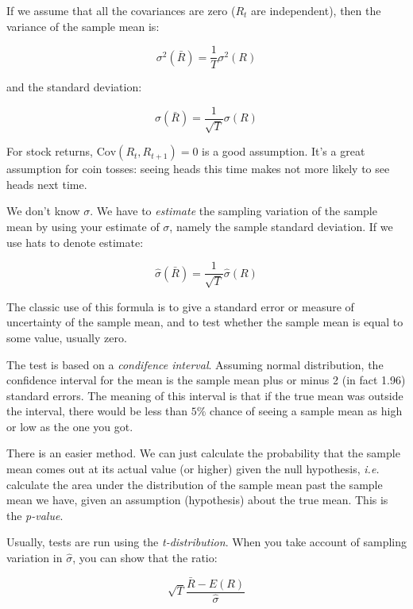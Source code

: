 If we assume that all the covariances are zero ($R_t$ are 
independent), then the variance of the sample mean is:

\begin{equation}
    \sigma^2(\bar{R}) = \frac{1}{T}\sigma^2(R)
\end{equation}

and the standard deviation:

\begin{equation}
    \sigma(\bar{R}) = \frac{1}{\sqrt{T}}\sigma(R)
\end{equation}

For stock returns, $\text{Cov}(R_t, R_{t+1}) = 0$ 
is a good assumption. It's a great assumption for 
coin tosses: seeing heads this time makes not 
more likely to see heads next time. 

We don't know $\sigma$. We have to \textit{estimate}
the sampling variation of the sample mean by using 
your estimate of $\sigma$, namely the sample standard
deviation. If we use hats to denote estimate:

\begin{equation}
    \hat{\sigma}(\bar{R}) = \frac{1}{\sqrt{T}}\hat{\sigma}(R)
\end{equation}

The classic use of this formula is to give a standard error
or measure of uncertainty of the sample mean, and 
to test whether the sample mean is equal to some value,
usually zero. 

The test is based on a \textit{condifence interval}. 
Assuming normal distribution, the confidence interval 
for the mean is the sample mean plus or minus 2 (in fact 1.96)
standard errors. The meaning of this interval 
is that if the true mean was outside the interval, 
there would be less than $5\%$ chance of seeing a 
sample mean as high or low as the one you got.

There is an easier method. We can just calculate the
probability that the sample mean comes out at its 
actual value (or higher) given the null hypothesis,
\textit{i.e.} calculate the area under the distribution 
of the sample mean past the sample mean we have,
given an assumption (hypothesis) about the true mean.
This is the \textit{p-value}.

Usually, tests are run using the \textit{t-distribution}.
When you take account of sampling variation in $\hat{\sigma}$,
you can show that the ratio:

\begin{equation}
    \sqrt{T}\frac{\bar{R} - E(R)}{\hat{\sigma}}
\end{equation}

